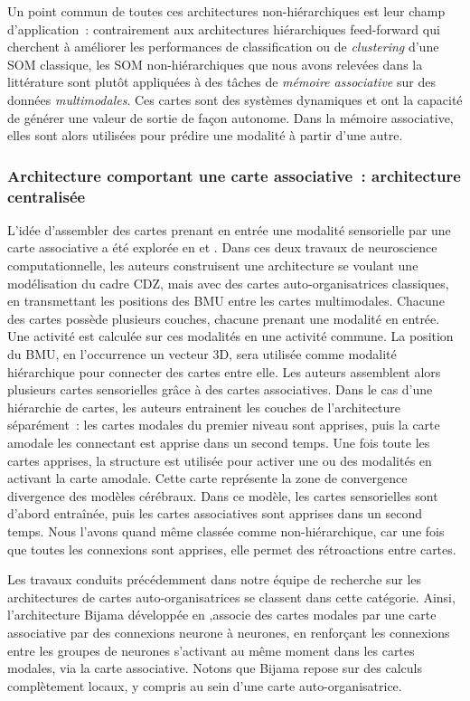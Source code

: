 \documentclass[../main]{subfiles}
\begin{document}
Un point commun de toutes ces architectures non-hiérarchiques est leur champ d'application~: contrairement aux architectures hiérarchiques feed-forward qui cherchent à améliorer les performances de classification ou de \emph{clustering} d'une SOM classique, les SOM non-hiérarchiques que nous avons relevées dans la littérature sont plutôt appliquées à des tâches de \emph{mémoire associative} sur des données \emph{multimodales}. Ces cartes sont des systèmes dynamiques et ont la capacité de générer une valeur de sortie de façon autonome. Dans la mémoire associative, elles sont alors utilisées pour prédire une modalité à partir d'une autre.

\subsubsection{Architecture comportant une carte associative~: architecture centralisée}

L'idée d'assembler des cartes prenant en entrée une modalité sensorielle par une carte associative a été explorée en \cite{dominey13} et \cite{escobar-juarez_self-organized_2016}.
Dans ces deux travaux de neuroscience computationnelle, les auteurs construisent une architecture se voulant une modélisation du cadre CDZ, mais avec des cartes auto-organisatrices classiques, en transmettant les positions des BMU entre les cartes multimodales. 
Chacune des cartes possède plusieurs couches, chacune prenant une modalité en entrée. Une activité est calculée sur ces modalités en une activité commune. La position du BMU, en l'occurrence un vecteur 3D, sera utilisée comme modalité hiérarchique pour connecter des cartes entre elle. Les auteurs assemblent alors plusieurs cartes sensorielles grâce à des cartes associatives.
Dans le cas d'une hiérarchie de cartes, les auteurs entrainent les couches de l'architecture séparément~: les cartes modales du premier niveau sont apprises, puis la carte amodale les connectant est apprise dans un second temps. 
Une fois toute les cartes apprises, la structure est utilisée pour activer une ou des modalités en activant la carte amodale. Cette carte représente la zone de convergence divergence des modèles cérébraux. 
Dans ce modèle, les cartes sensorielles sont d'abord entraînée, puis les cartes associatives sont apprises dans un second temps. Nous l'avons quand même classée comme non-hiérarchique, car une fois que toutes les connexions sont apprises, elle permet des rétroactions entre cartes. 

Les travaux conduits précédemment dans notre équipe de recherche sur les architectures de cartes auto-organisatrices se classent dans cette catégorie. Ainsi, l'architecture Bijama développée en \cite{menard05,khouzam_2013},associe des cartes modales par une carte associative par des connexions neurone à neurones, en renforçant les connexions entre les groupes de neurones s'activant au même moment dans les cartes modales, via la carte associative.
Notons que Bijama repose sur des calculs complètement locaux, y compris au sein d'une carte auto-organisatrice.
\end{document}

